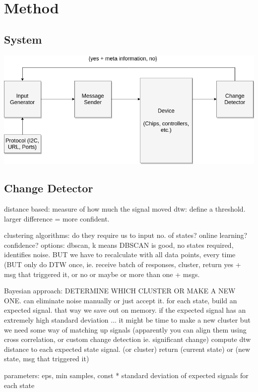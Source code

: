 \documentclass[12pt, a4paper]{article}
\begin{document}
\section*{Method}

\subsection*{System}

\includegraphics[scale=0.5]{Fuzzer.png}

\subsection*{Change Detector}
distance based: measure of how much the signal moved
dtw: define a threshold. larger difference = more confident.

clustering algorithms: do they require us to input no. of states? online learning? confidence?
options: dbscan, k means
DBSCAN is good, no states required, identifies noise. BUT we have to recalculate with all data points, every time (BUT only do DTW once, ie. 
receive batch of responses, cluster, return yes + msg that triggered it, or no or maybe or more than one + msgs.

Bayesian approach: DETERMINE WHICH CLUSTER OR MAKE A NEW ONE. can eliminate noise manually or just accept it.
for each state, build an expected signal. that way we save out on memory. 
if the expected signal has an extremely high standard deviation ... it might be time to make a new cluster
but we need some way of matching up signals (apparently you can align them using cross correlation, or custom change detection ie. significant change)
compute dtw distance to each expected state signal. (or cluster)
return (current state) or (new state, msg that triggered it)

parameters: eps, min samples, const * standard deviation of expected signals for each state
\end{document}

